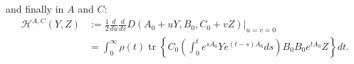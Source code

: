 \documentclass{article}
\newcommand{\R}{\mathbb{R}}
\newcommand{\tr}{\mathop{\mbox{tr}}} %
\newcommand{\1}{\mathbbm{1}}
\begin{document}
and finally in $A$ and $C$:
\begin{equation}
    \begin{aligned}
        \mathcal{H}^{A,C}(Y,Z)
        &:= 
        \frac{1}{2} \frac{d}{du} \frac{d}{dv} D(A_0+uY,B_0,C_0+vZ)\vert_{u=v=0} \\
        &=
        \int_0^\infty \rho(t) \tr\left\{ 
        C_0 \left(\int_0^t e^{s A_0} Y e^{(t-s) A_0} ds \right) B_0
        B_0 e^{t A_0} Z
        \right\} dt  .
  \end{aligned}
\end{equation}


%
\end{document}
